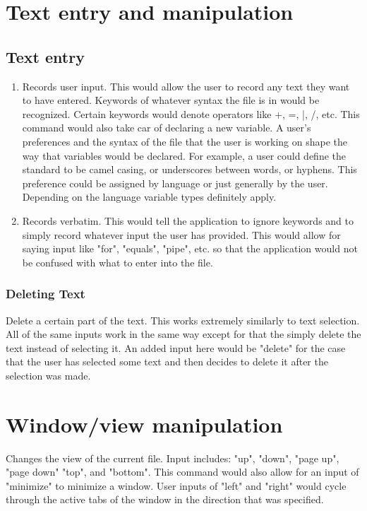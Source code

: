 \documentclass[11pt, oneside]{article}
\begin{document}
\section{Text entry and manipulation}

	\subsection{Text entry}
	\begin{enumerate}
	\item {}
	Records user input. This would allow the user to record any text they want to have entered. Keywords of whatever syntax the file is in would be recognized. Certain keywords would denote operators like +, =, |, /, etc. This command would also take car of declaring a new variable. A user's preferences and the syntax of the file that the user is working on shape the way that variables would be declared. For example, a user could define the standard to be camel casing, or underscores between words, or hyphens. This preference could be assigned by language or just generally by the user. Depending on the language variable types definitely apply.

	\item {}
	Records verbatim. This would tell the application to ignore keywords and to simply record whatever input the user has provided. This would allow for saying input like "for", "equals", "pipe", etc. so that the application would not be confused with what to enter into the file.
	\end{enumerate}

	\subsubsection{Deleting Text}
	Delete a certain part of the text. This works extremely similarly to text selection. All of the same inputs work in the same way except for that the simply delete the text instead of selecting it. An added input here would be "delete" for the case that the user has selected some text and then decides to delete it after the selection was made.


\section{Window/view manipulation}

	Changes the view of the current file. Input includes: "up", "down", "page up", "page down" "top", and "bottom". This command would also allow for an input of "minimize" to minimize a window. User inputs of "left" and "right" would cycle through the active tabs of the window in the direction that was specified.
\end{document}
